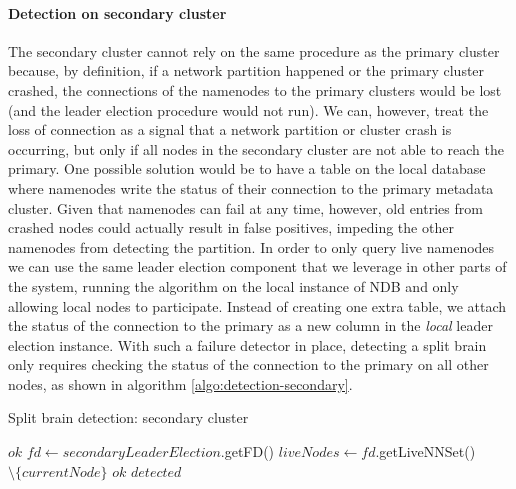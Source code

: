 \paragraph{Detection on secondary cluster}

The secondary cluster cannot rely on the same procedure as the primary cluster because, by definition, if a network partition happened or the primary cluster crashed, the connections of the namenodes to the primary clusters would be lost (and the leader election procedure would not run).
We can, however, treat the loss of connection as a signal that a network partition or cluster crash is occurring, but only if all nodes in the secondary cluster are not able to reach the primary.
One possible solution would be to have a table on the local database where namenodes write the status of their connection to the primary metadata cluster.
Given that namenodes can fail at any time, however, old entries from crashed nodes could actually result in false positives, impeding the other namenodes from detecting the partition.
In order to only query live namenodes we can use the same leader election component that we leverage in other parts of the system, running the algorithm on the local instance of NDB and only allowing local nodes to participate.
Instead of creating one extra table, we attach the status of the connection to the primary as a new column in the \emph{local} leader election instance.
With such a failure detector in place, detecting a split brain only requires checking the status of the connection to the primary on all other nodes, as shown in algorithm \ref{algo:detection-secondary}.

\begin{algorithm}[!ht]
	\begin{algorithmic}[1]
  		\caption{Split brain detection: secondary cluster}
  		\label{algo:detection-secondary}
  		    \State \Return $ok$
  		\EndIf
  		\State $fd \leftarrow secondaryLeaderElection$.getFD()
		\State $liveNodes \leftarrow fd$.getLiveNNSet() $\setminus \{currentNode\}$
		        \State \Return $ok$
		    \EndIf
		\EndFor
		\State \Return $detected$
  	\end{algorithmic}
\end{algorithm}

